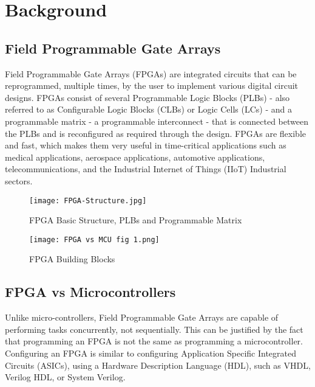 \section{Background}
\subsection{Field Programmable Gate Arrays}
\par Field Programmable Gate Arrays (FPGAs) are integrated circuits that can be reprogrammed, multiple times, by the user to implement various digital circuit designs. FPGAs consist of several Programmable Logic Blocks (PLBs) - also referred to as Configurable Logic Blocks (CLBs) or Logic Cells (LCs) - and a programmable matrix - a programmable interconnect - that is connected between the PLBs and is reconfigured as required through the design. FPGAs are flexible and fast, which makes them very useful in time-critical applications such as medical applications, aerospace applications, automotive applications, telecommunications, and the Industrial Internet of Things (IIoT) Industrial sectors. \newline

\begin{figure}[H]
    \centering
    \texttt{[image: FPGA-Structure.jpg]}
    \caption{FPGA Basic Structure, PLBs and Programmable Matrix \cite{figone}}
    \label{fig:FPGAstruct}   
\end{figure}

\begin{figure}[H]
    \centering
    \texttt{[image: FPGA vs MCU fig 1.png]}
    \caption{FPGA Building Blocks \cite{figtwo}}
    \label{fig:FPGAbuildingBlocks}   
\end{figure}

\subsection{FPGA vs Microcontrollers}
\par Unlike micro-controllers, Field Programmable Gate Arrays are capable of performing tasks concurrently, not sequentially. This can be justified by the fact that programming an FPGA is not the same as programming a microcontroller. Configuring an FPGA is similar to configuring Application Specific Integrated Circuits (ASICs), using a Hardware Description Language (HDL), such as VHDL, Verilog HDL, or System Verilog. \newline 

